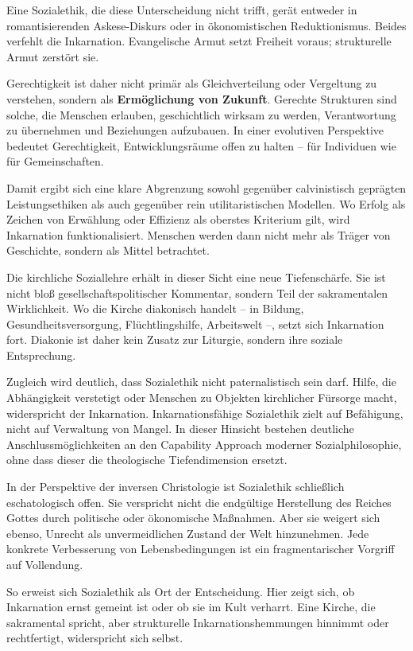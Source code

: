 \documentclass[
]{article}
\begin{document}
Eine Sozialethik, die diese Unterscheidung nicht trifft, gerät entweder in romantisierenden Askese-Diskurs oder in ökonomistischen Reduktionismus. Beides verfehlt die Inkarnation. Evangelische Armut setzt Freiheit voraus; strukturelle Armut zerstört sie.

Gerechtigkeit ist daher nicht primär als Gleichverteilung oder Vergeltung zu verstehen, sondern als \textbf{Ermöglichung von Zukunft}. Gerechte Strukturen sind solche, die Menschen erlauben, geschichtlich wirksam zu werden, Verantwortung zu übernehmen und Beziehungen aufzubauen. In einer evolutiven Perspektive bedeutet Gerechtigkeit, Entwicklungsräume offen zu halten -- für Individuen wie für Gemeinschaften.

Damit ergibt sich eine klare Abgrenzung sowohl gegenüber calvinistisch geprägten Leistungsethiken als auch gegenüber rein utilitaristischen Modellen. Wo Erfolg als Zeichen von Erwählung oder Effizienz als oberstes Kriterium gilt, wird Inkarnation funktionalisiert. Menschen werden dann nicht mehr als Träger von Geschichte, sondern als Mittel betrachtet.

Die kirchliche Soziallehre erhält in dieser Sicht eine neue Tiefenschärfe. Sie ist nicht bloß gesellschaftspolitischer Kommentar, sondern Teil der sakramentalen Wirklichkeit. Wo die Kirche diakonisch handelt -- in Bildung, Gesundheitsversorgung, Flüchtlingshilfe, Arbeitswelt --, setzt sich Inkarnation fort. Diakonie ist daher kein Zusatz zur Liturgie, sondern ihre soziale Entsprechung.

Zugleich wird deutlich, dass Sozialethik nicht paternalistisch sein darf. Hilfe, die Abhängigkeit verstetigt oder Menschen zu Objekten kirchlicher Fürsorge macht, widerspricht der Inkarnation. Inkarnationsfähige Sozialethik zielt auf Befähigung, nicht auf Verwaltung von Mangel. In dieser Hinsicht bestehen deutliche Anschlussmöglichkeiten an den Capability Approach moderner Sozialphilosophie, ohne dass dieser die theologische Tiefendimension ersetzt.

In der Perspektive der inversen Christologie ist Sozialethik schließlich eschatologisch offen. Sie verspricht nicht die endgültige Herstellung des Reiches Gottes durch politische oder ökonomische Maßnahmen. Aber sie weigert sich ebenso, Unrecht als unvermeidlichen Zustand der Welt hinzunehmen. Jede konkrete Verbesserung von Lebensbedingungen ist ein fragmentarischer Vorgriff auf Vollendung.

So erweist sich Sozialethik als Ort der Entscheidung. Hier zeigt sich, ob Inkarnation ernst gemeint ist oder ob sie im Kult verharrt. Eine Kirche, die sakramental spricht, aber strukturelle Inkarnationshemmungen hinnimmt oder rechtfertigt, widerspricht sich selbst.
\end{document}
